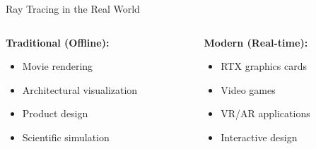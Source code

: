\begin{frame}{Ray Tracing in the Real World}
    \begin{columns}
        \begin{column}{0.5\textwidth}
            \textbf{Traditional (Offline):}
            \begin{itemize}
                \item Movie rendering
                \item Architectural visualization
                \item Product design
                \item Scientific simulation
            \end{itemize}
        \end{column}
        \begin{column}{0.5\textwidth}
            \textbf{Modern (Real-time):}
            \begin{itemize}
                \item RTX graphics cards
                \item Video games
                \item VR/AR applications
                \item Interactive design
            \end{itemize}
        \end{column}
    \end{columns}
\end{frame}

